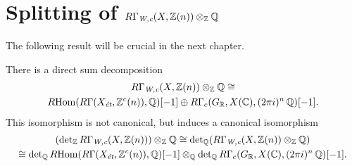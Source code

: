 
\section{Splitting of $R\Gamma_\text{\it W,c} (X,\mathbb{Z} (n))\otimes_{\mathbb{Z}} \mathbb{Q}$}
\label{section:splitting-of-RGammaWc}

The following result will be crucial in the next chapter.

\begin{proposition}
  \label{prop:RGammaWc-with-rational-coefficients}
  There is a direct sum decomposition
  \begin{multline*}
    R\Gamma_\text{\it W,c} (X,\mathbb{Z} (n))\otimes_{\mathbb{Z}} \mathbb{Q} \cong\\
    R\!\operatorname{Hom} (R\Gamma (X_\text{\it ét}, \mathbb{Z}^c (n)), \mathbb{Q}) [-1]
    \oplus
    R\Gamma_c (G_{\mathbb{R}}, X (\mathbb{C}), (2\pi i)^n\,\mathbb{Q}) [-1].
  \end{multline*}
  This isomorphism is not canonical, but induces a canonical isomorphism
  \begin{multline*}
    (\det\nolimits_{\mathbb{Z}} R\Gamma_\text{\it W,c} (X,\mathbb{Z} (n)))\otimes_{\mathbb{Z}} \mathbb{Q} \cong
    \det\nolimits_{\mathbb{Q}} (R\Gamma_\text{\it W,c} (X,\mathbb{Z} (n))\otimes_{\mathbb{Z}} \mathbb{Q}) \\
    \cong
    \det\nolimits_{\mathbb{Q}} R\!\operatorname{Hom} (R\Gamma (X_\text{\it ét}, \mathbb{Z}^c (n)), \mathbb{Q}) [-1]
    \otimes_{\mathbb{Q}}
    \det\nolimits_{\mathbb{Q}} R\Gamma_c (G_{\mathbb{R}}, X (\mathbb{C}), (2\pi i)^n\,\mathbb{Q}) [-1].
  \end{multline*}


\end{proposition}
